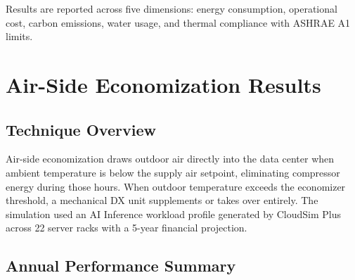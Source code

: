 ﻿\documentclass[12pt,a4paper]{report}
\begin{document}
\noindent Results are reported across five dimensions: energy consumption, operational cost,
carbon emissions, water usage, and thermal compliance with ASHRAE A1 limits.

\section{Air-Side Economization Results}
\label{sec:air}

\subsection{Technique Overview}

Air-side economization draws outdoor air directly into the data center when ambient
temperature is below the supply air setpoint, eliminating compressor energy during those
hours. When outdoor temperature exceeds the economizer threshold, a mechanical DX unit
supplements or takes over entirely. The simulation used an AI Inference workload profile
generated by CloudSim Plus across 22 server racks with a 5-year financial projection.

\subsection{Annual Performance Summary}
\end{document}
